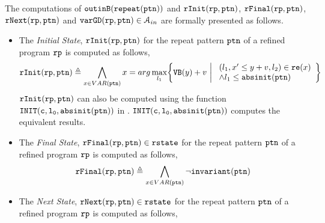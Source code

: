   \begin{defn}
    \label{def:edge_pathinsensitivebound}
   The computations of $\mathtt{outinB}(\mathtt{repeat}({\mathtt{ptn}}))$ and $\mathtt{rInit}(\mathtt{rp}, \mathtt{ptn})$,
   $\mathtt{rFinal}(\mathtt{rp}, \mathtt{ptn})$, $\mathtt{rNext}(\mathtt{rp}, \mathtt{ptn})$ and $\mathtt{varGD}(\mathtt{rp}, \mathtt{ptn}) \in \mathcal{A}_{in}$
   are formally presented as follows.
   \begin{itemize}
    \item The \emph{Initial State}, $\mathtt{rInit}(\mathtt{rp}, \mathtt{ptn})$ for the repeat pattern $\mathtt{ptn}$ of a refined program $\mathtt{rp}$ is computed as follows,
   \[
     \rfinit(\rprog, \rpattern) \triangleq 
     \bigwedge_{x \in VAR(\rpattern)}
     x
     = arg\max_{l_1}\left\{
       \varinvar(y) + v ~\middle\vert~ 
       \begin{array}{l} 
         (l_1, x' \leq y + v, l_2) \in \reset(x) 
         \\
       \land l_1 \leq \absinit(\rpattern)
     \end{array}
     \right\}
     \]
   $\mathtt{rInit}(\mathtt{rp}, \mathtt{ptn})$ can also be computed using the function $\mathtt{INIT(c, l_0, \mathtt{abs}{\mathtt{init}}(\mathtt{ptn}))}$ in \cite{GulwaniJK09}. 
   $\mathtt{INIT(c, l_0, \mathtt{abs}{\mathtt{init}}(\mathtt{ptn}))}$ computes the equivalent results.
   \item  The {\emph{Final State}, $\mathtt{rFinal}(\mathtt{rp}, \mathtt{ptn}) \in \mathtt{rstate}$ for the repeat pattern $\mathtt{ptn}$ of a refined program $\mathtt{rp}$ is computed as follows, }
   \[
     \mathtt{rFinal}(\mathtt{rp}, \mathtt{ptn}) \triangleq 
     \bigwedge_{x \in VAR(\mathtt{ptn})}
     \neg \mathtt{invariant}(\mathtt{ptn})
     \]
   \item The \emph{Next State}, $\mathtt{rNext}(\mathtt{rp}, \mathtt{ptn}) \in \mathtt{rstate}$ for the repeat pattern $\mathtt{ptn}$ of a refined program $\mathtt{rp}$ is computed as follows,

\end{itemize}
\end{defn}
